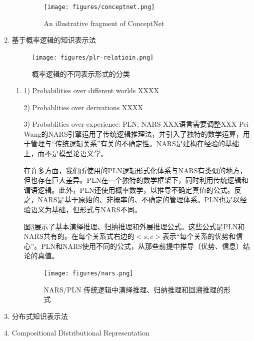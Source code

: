 \begin{enumerate}
\begin{enumerate}
\begin{figure}[htb]
\centering
\texttt{[image: figures/conceptnet.png]}
\caption{ An illustrative fragment of ConceptNet }
\label{fig:concept}
\end{figure}


\end{enumerate}

\item[2]  {基于概率逻辑的知识表示法}

\begin{figure}[htb]
\centering
\texttt{[image: figures/plr-relatioin.png]}
\caption{概率逻辑的不同表示形式的分类}
\label{fig:plr-relation}
\end{figure}

\begin{enumerate}

\item1) Probabilities over different worlds
XXXX

2) Probablities over derivations
XXXX

3) Probablities over experience: PLN, NARS
XXX语言需要调整XXX
Pei Wang的NARS引擎运用了传统逻辑推理法\cite{Wang2006}，并引入了独特的数学运算，用于管理与“传统逻辑关系”有关的不确定性。NARS是建构在经验的基础上，而不是模型论语义学。

在许多方面，我们所使用的PLN逻辑形式化体系与NARS有类似的地方，但也存在巨大差异。PLN在一个独特的数学框架下，同时利用传统逻辑和谓语逻辑。此外，PLN还使用概率数学，以推导不确定真值的公式。反之，NARS是基于原始的、非概率的、不确定的管理体系。PLN也是以经验语义为基础，但形式与NARS不同。


图\ref{fig:nars}展示了基本演绎推理、归纳推理和外展推理公式。这些公式是PLN和NARS共有的。在每个关系式右边的$<s,c>$表示“每个关系的优势和信心”。PLN和NARS使用不同的公式，从那些前提中推导（优势、信息）结论的真值。

\begin{figure}[htb]
\centering
\texttt{[image: figures/nars.png]}
\caption{ NARS/PLN 传统逻辑中演绎推理、归纳推理和回溯推理的形式 }
\label{fig:nars}
\end{figure}


\end{enumerate}

\item[3]  {分布式知识表示法}



\item[4]  {Compositional Distributional Representation}



\end{enumerate}









